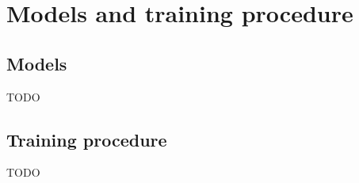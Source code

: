 \chapter{Models and training procedure}
\label{app:model_training}
\section{Models}
TODO
\section{Training procedure}
TODO

